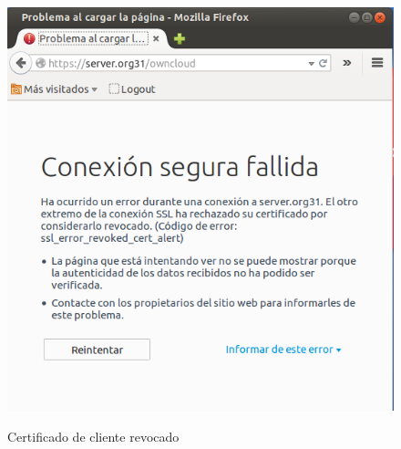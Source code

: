 \documentclass[]{article}
\begin{document}
\begin{figure}[h]
	\caption{Certificado de cliente revocado}
	\centering
	\includegraphics[scale=0.5]{images/certs/revoked.png}
	\label{fig:revoked}
\end{figure}




               
   
\end{document}
